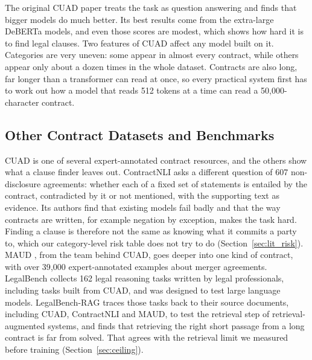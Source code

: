 The original CUAD paper treats the task as question answering and finds that bigger models do much better. Its best results come from the extra-large DeBERTa models, and even those scores are modest, which shows how hard it is to find legal clauses. Two features of CUAD affect any model built on it. Categories are very uneven: some appear in almost every contract, while others appear only about a dozen times in the whole dataset. Contracts are also long, far longer than a transformer can read at once, so every practical system first has to work out how a model that reads 512 tokens at a time can read a 50{,}000-character contract.
\subsection{Other Contract Datasets and Benchmarks}
\label{sec:lit_datasets}
CUAD is one of several expert-annotated contract resources, and the others show what a clause finder leaves out. ContractNLI \cite{koreeda2021contractnli} asks a different question of 607 non-disclosure agreements: whether each of a fixed set of statements is entailed by the contract, contradicted by it or not mentioned, with the supporting text as evidence. Its authors find that existing models fail badly and that the way contracts are written, for example negation by exception, makes the task hard. Finding a clause is therefore not the same as knowing what it commits a party to, which our category-level risk table does not try to do (Section~\ref{sec:lit_risk}). MAUD \cite{wang2023maud}, from the team behind CUAD, goes deeper into one kind of contract, with over 39{,}000 expert-annotated examples about merger agreements. LegalBench \cite{guha2023legalbench} collects 162 legal reasoning tasks written by legal professionals, including tasks built from CUAD, and was designed to test large language models. LegalBench-RAG \cite{pipitone2024legalbenchrag} traces those tasks back to their source documents, including CUAD, ContractNLI and MAUD, to test the retrieval step of retrieval-augmented systems, and finds that retrieving the right short passage from a long contract is far from solved. That agrees with the retrieval limit we measured before training (Section~\ref{sec:ceiling}).

